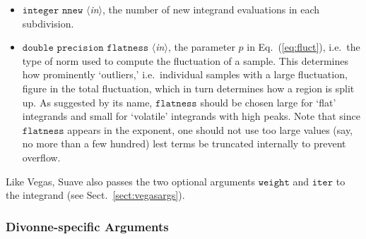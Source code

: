 \documentclass[12pt]{article}
\newcommand\ie{i.e.\ }
\newcommand\Code[1]{\ensuremath{\texttt{#1}}}
\newcommand\VarIn[1]{\item\Code{#1} \textit{$\langle$in\/$\rangle$},}
\begin{document}
\begin{itemize}
\VarIn{integer nnew}
the number of new integrand evaluations in each subdivision.

\VarIn{double precision flatness}
the parameter $p$ in Eq.~(\ref{eq:fluct}), \ie the type of norm used to
compute the fluctuation of a sample.  This determines how prominently
`outliers,' \ie individual samples with a large fluctuation, figure in
the total fluctuation, which in turn determines how a region is split
up.  As suggested by its name, \Code{flatness} should be chosen large
for `flat' integrands and small for `volatile' integrands with high
peaks.  Note that since \Code{flatness} appears in the exponent, one
should not use too large values (say, no more than a few hundred) lest
terms be truncated internally to prevent overflow.
\end{itemize}

Like Vegas, Suave also passes the two optional arguments \Code{weight}
and \Code{iter} to the integrand (see Sect.~\ref{sect:vegasargs}).


\subsubsection{Divonne-specific Arguments}
\label{sect:divonneargs}
\end{document}
